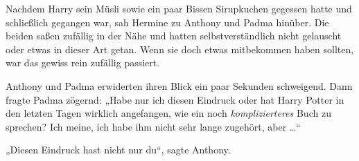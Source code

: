 Nachdem Harry sein Müsli sowie ein paar Bissen Sirupkuchen gegessen hatte und schließlich gegangen war, sah Hermine zu Anthony und Padma hinüber. Die beiden saßen zufällig in der Nähe und hatten selbstverständlich nicht gelauscht oder etwas in dieser Art getan. Wenn sie doch etwas mitbekommen haben sollten, war das gewiss rein zufällig passiert.

Anthony und Padma erwiderten ihren Blick ein paar Sekunden schweigend. Dann fragte Padma zögernd:
„Habe nur ich diesen Eindruck oder hat Harry Potter in den letzten Tagen wirklich angefangen, wie ein noch \emph{komplizierteres} Buch zu sprechen? Ich meine, ich habe ihm nicht sehr lange zugehört, aber …“

„Diesen Eindruck hast nicht nur du“, sagte Anthony.

